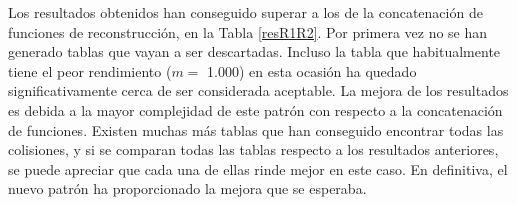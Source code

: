 \documentclass[12pt,spanish,listoffigures,listoftables,listofalgorithms]{tfgetsinf}
\begin{document}
\def\arraystretch{1.5}
\begin{table}[H]
	\LARGE
	\centering
	\caption{Porcentajes de éxito para las tablas empleando el patrón reducido}
	\label{respp}
\end{table}

Los resultados obtenidos han conseguido superar a los de la concatenación de funciones de reconstrucción, en la Tabla \ref{resR1R2}. Por primera vez no se han generado tablas que vayan a ser descartadas. Incluso la tabla que habitualmente tiene el peor rendimiento ($m =$ 1.000) en esta ocasión ha quedado significativamente cerca de ser considerada aceptable. La mejora de los resultados es debida a la mayor complejidad de este patrón con respecto a la concatenación de funciones. Existen muchas más tablas que han conseguido encontrar todas las colisiones, y si se comparan todas las tablas respecto a los resultados anteriores, se puede apreciar que cada una de ellas rinde mejor en este caso. En definitiva, el nuevo patrón ha proporcionado la mejora que se esperaba.
\end{document}
